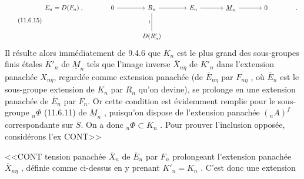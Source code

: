 \begin{equation}\tag{11.6.15}
\begin{tikzcd}[column sep=large, row sep=large]
E_n = D(F_n) \; , & 0 \arrow[r] & R_n \arrow[r] \arrow[d, dash, "\wr"'] & E_n \arrow[r] & \underline{M}_n \arrow[r] & 0 & . \\
& & D(R'_n) & & & &
\end{tikzcd}
\end{equation}
Il résulte alors immédiatement de 9.4.6 que $K_n$ est le plus grand des sous-groupes finis étales $K'_n$ de $\underline{M}_n$ tels que l'image inverse $\overline{X}_{n\eta}$ de $K'_n$ dans l'extension panachée $X_{n\eta}$, regardée comme extension panachée (de $\overline{E}_{n\eta}$ par $F_{n\eta}$ , où $\overline{E}_n$ est le sous-groupe extension de $K_n$ par $R_n$ qu'on devine), se prolonge en une extension panachée de $\overline{E}_n$ par $F_n$. Or cette condition est évidemment remplie pour le sous-groupe ${}_n\Phi$ (11.6.11) de $\underline{M}_n$ , puisqu'on dispose de l'extension panachée $({}_nA)^f$ correspondante sur $S$. On a donc ${}_n\Phi \subset K_n$ . Pour prouver l'inclusion opposée, considérons l'ex CONT>>



<<CONT tension panachée $\overline{X}_n$ de $\overline{E}_n$ par $F_n$ prolongeant l'extension panachée $\overline{X}_{n\eta}$ , définie comme ci-dessus en y prenant $K'_n = K_n$ . C'est donc une extension

